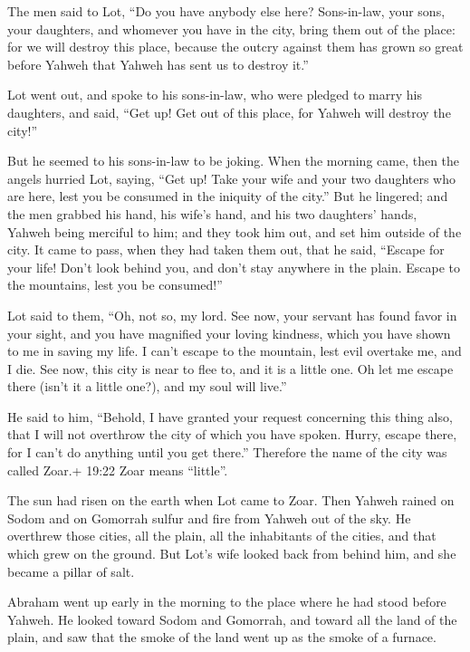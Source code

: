  The men said to Lot, ``Do you have anybody else here?
Sons-in-law, your sons, your daughters, and whomever you have in the
city, bring them out of the place:  for we will destroy
this place, because the outcry against them has grown so great before
Yahweh that Yahweh has sent us to destroy it.''

 Lot went out, and spoke to his sons-in-law, who were
pledged to marry his daughters, and said, ``Get up! Get out of this
place, for Yahweh will destroy the city!''

But he seemed to his sons-in-law to be joking.  When the
morning came, then the angels hurried Lot, saying, ``Get up! Take your
wife and your two daughters who are here, lest you be consumed in the
iniquity of the city.''  But he lingered; and the men
grabbed his hand, his wife's hand, and his two daughters' hands, Yahweh
being merciful to him; and they took him out, and set him outside of the
city.  It came to pass, when they had taken them out, that
he said, ``Escape for your life! Don't look behind you, and don't stay
anywhere in the plain. Escape to the mountains, lest you be consumed!''

 Lot said to them, ``Oh, not so, my lord.  See
now, your servant has found favor in your sight, and you have magnified
your loving kindness, which you have shown to me in saving my life. I
can't escape to the mountain, lest evil overtake me, and I die.
 See now, this city is near to flee to, and it is a little
one. Oh let me escape there (isn't it a little one?), and my soul will
live.''

 He said to him, ``Behold, I have granted your request
concerning this thing also, that I will not overthrow the city of which
you have spoken.  Hurry, escape there, for I can't do
anything until you get there.'' Therefore the name of the city was
called Zoar.+ 19:22 Zoar means ``little''.

 The sun had risen on the earth when Lot came to Zoar.
 Then Yahweh rained on Sodom and on Gomorrah sulfur and
fire from Yahweh out of the sky.  He overthrew those
cities, all the plain, all the inhabitants of the cities, and that which
grew on the ground.  But Lot's wife looked back from behind
him, and she became a pillar of salt.

 Abraham went up early in the morning to the place where he
had stood before Yahweh.  He looked toward Sodom and
Gomorrah, and toward all the land of the plain, and saw that the smoke
of the land went up as the smoke of a furnace.

